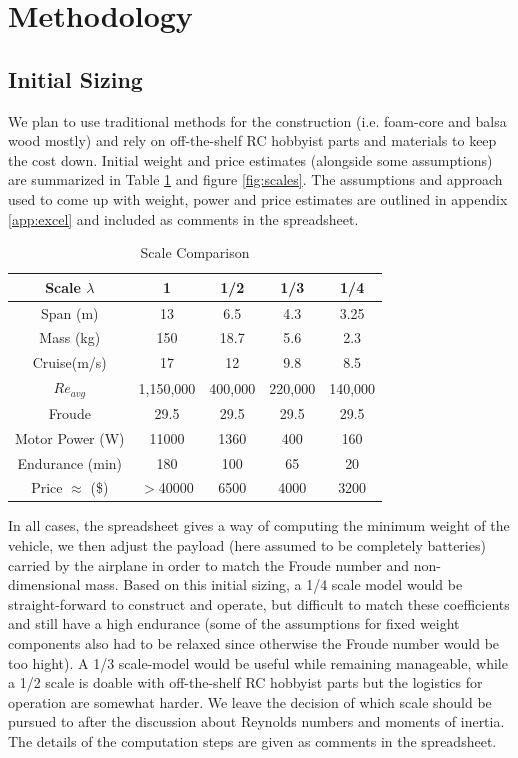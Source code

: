 \documentclass[titlepage,10pt]{article}
\begin{document}
\section{Methodology}
\subsection{Initial Sizing}
\label{sec:initialsizing}
We plan to use traditional methods for the construction (i.e. foam-core and balsa wood mostly) and rely on off-the-shelf RC hobbyist parts and materials to keep the cost down. Initial weight and price estimates (alongside some assumptions) are summarized in Table \ref{tab:scales} and figure \ref{fig:scales}. The assumptions and approach used to come up with weight, power and price estimates are outlined in appendix \ref{app:excel} and included as comments in the spreadsheet. \\

\begin{table}[h]
\begin{center}
\begin{tabular}{|c|c|c|c|c|}
\hline
Scale $\lambda$	& 1 & 1/2 & 1/3 & 1/4 \\ \hline
Span (m)	& 13& 6.5 & 4.3 & 3.25\\ 
Mass (kg)	& 150& 18.7 & 5.6   & 2.3 \\
Cruise(m/s)	& 17 & 12 & 9.8   & 8.5 \\
$Re_{avg}$  	& 1,150,000 & 400,000 & 220,000 & 140,000 \\
Froude		& 29.5 & 29.5 & 29.5 & 29.5 \\
Motor Power (W) & 11000 & 1360 & 400 & 160 \\
Endurance (min) & 180  & 100 & 65 & 20 \\
Price $\approx$ (\$) & $>$40000 & 6500 & 4000 & 3200 \\
\hline
\end{tabular}
\caption{Scale Comparison}
\label{tab:scales}
\end{center}
\end{table}

In all cases, the spreadsheet gives a way of computing the minimum weight of the vehicle, we then adjust the payload (here assumed to be completely batteries) carried by the airplane in order to match the Froude number and non-dimensional mass. Based on this initial sizing, a 1/4 scale model would be straight-forward to construct and operate, but difficult to match these coefficients and still have a high endurance (some of the assumptions for fixed weight components also had to be relaxed since otherwise the Froude number would be too hight). A 1/3 scale-model would be useful while remaining manageable, while a 1/2 scale is doable with off-the-shelf RC hobbyist parts but the logistics for operation are somewhat harder.  We leave the decision of which scale should be pursued to after the discussion about Reynolds numbers and moments of inertia. The details of the computation steps are given as comments in the spreadsheet.\\
\end{document}
